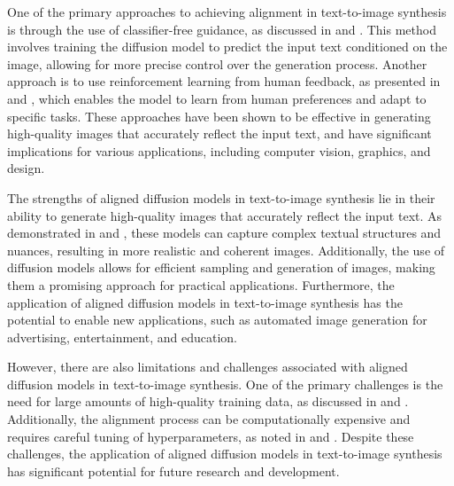 \documentclass[11pt,a4paper]{article}
\begin{document}
One of the primary approaches to achieving alignment in text-to-image synthesis is through the use of classifier-free guidance, as discussed in \cite{arxiv:2102.09672} and \cite{arxiv:2202.09778}. This method involves training the diffusion model to predict the input text conditioned on the image, allowing for more precise control over the generation process. Another approach is to use reinforcement learning from human feedback, as presented in \cite{arxiv:2305.13301} and \cite{doi:10.1109/cvpr52734.2025.02198}, which enables the model to learn from human preferences and adapt to specific tasks. These approaches have been shown to be effective in generating high-quality images that accurately reflect the input text, and have significant implications for various applications, including computer vision, graphics, and design.

The strengths of aligned diffusion models in text-to-image synthesis lie in their ability to generate high-quality images that accurately reflect the input text. As demonstrated in \cite{arxiv:2303.07576} and \cite{doi:10.1007/978-3-031-72970-6_2}, these models can capture complex textual structures and nuances, resulting in more realistic and coherent images. Additionally, the use of diffusion models allows for efficient sampling and generation of images, making them a promising approach for practical applications. Furthermore, the application of aligned diffusion models in text-to-image synthesis has the potential to enable new applications, such as automated image generation for advertising, entertainment, and education.

However, there are also limitations and challenges associated with aligned diffusion models in text-to-image synthesis. One of the primary challenges is the need for large amounts of high-quality training data, as discussed in \cite{arxiv:2502.06805} and \cite{arxiv:2408.10207}. Additionally, the alignment process can be computationally expensive and requires careful tuning of hyperparameters, as noted in \cite{arxiv:2106.00132} and \cite{arxiv:2403.03852}. Despite these challenges, the application of aligned diffusion models in text-to-image synthesis has significant potential for future research and development.
\end{document}
